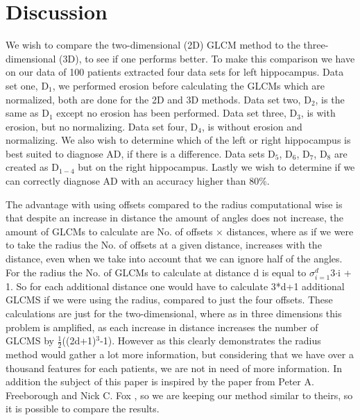 \chapter{Discussion}

We wish to compare the two-dimensional (2D) GLCM method to the three-dimensional (3D), to see if one performs better. To make this comparison we have on our data of 100 patients extracted four data sets for left hippocampus. Data set one, D$_1$, we performed erosion before calculating the GLCMs which are normalized, both are done for the 2D and 3D methods. Data set two, D$_2$, is the same as D$_1$ except no erosion has been performed. Data set three, D$_3$, is with erosion, but no normalizing. Data set four, D$_4$, is without erosion and normalizing.
We also wish to determine which of the left or right hippocampus is best suited to diagnose AD, if there is a difference. Data sets D$_5$, D$_6$, D$_7$, D$_8$ are created as D$_{1-4}$ but on the right hippocampus. 
Lastly we wish to determine if we can correctly diagnose AD with an accuracy higher than 80\%.



%


The advantage with using offsets compared to the radius computational wise is that despite an increase in distance the amount of angles does not increase, the amount of GLCMs to calculate are No. of offsets $\times$ distances, where as if we were to take the radius the No. of offsets at a given distance, increases with the distance, even when we take into account that we can ignore half of the angles. For  the radius the No. of GLCMs to calculate at distance d is equal to $\sigma_{i=1}^d$3$\cdot$i + 1. So for each additional distance one would have to calculate 3*d+1 additional GLCMS if we were using the radius, compared to just the four offsets. These calculations are just for the two-dimensional, where as in three dimensions this problem is amplified, as each increase in distance increases the number of GLCMS by $\frac{1}{2}$((2d+1)$^3$-1). However as this clearly demonstrates the radius method would gather a lot more information, but considering that we have over a thousand features for each patients, we are not in need of more information. In addition the subject of this paper is inspired by the paper from Peter A. Freeborough and Nick C. Fox \cite{MRfreeborough}, so we are keeping our method similar to theirs, so it  is possible to compare the results.


